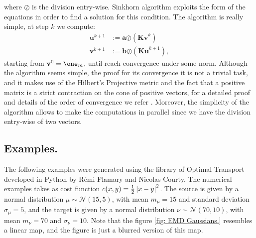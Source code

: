 where $\pmb{\oslash}$ is the division entry-wise. Sinkhorn algorithm exploits the form of the equations in order to find a solution for this condition. The algorithm is really simple, at step $k$ we compute: 
\begin{align}
	\mathbf{u}^{k+1}&:=\mathbf{a}\pmb{\oslash}(\mathbf{Kv}^{k})\\
	\mathbf{v}^{k+1}&:=\mathbf{b}\pmb{\oslash}(\mathbf{Ku}^{k+1}),
\end{align}
starting from $\mathbf{v}^0=\one_m$, until reach convergence under some norm. Although the algorithm seems simple, the proof for its convergence it is not a trivial task, and it makes use of the Hilbert's Projective metric and the fact that a positive matrix is a strict contraction on the cone of positive vectors, for a detailed proof and details of the order of convergence we refer \cite{Joel1989ScalingMatrices}. Moreover, the simplicity of the algorithm allows to make the computations in parallel since we have the division entry-wise of two vectors. 

\subsection{Examples.}

The following examples were generated using the library of Optimal Transport \cite{flamary2017pot} developed in Python by R\'emi Flamary and Nicolas Courty. The numerical examples takes as cost function $c(x,y)=\frac{1}{2}\left| x-y \right|^2$. The source is given by a normal distribution $\mu\sim\mathcal{N}(15,5)$, with mean $m_\mu=15$ and standard deviation $\sigma_\mu=5$, and the target is given by a normal distribution $\nu\sim\mathcal{N}(70,10)$, with mean $m_\nu=70$ and $\sigma_\nu=10$. Note that the figure \ref{fig: EMD Gaussians.} resembles a linear map, and the figure is just a blurred version of this map.

